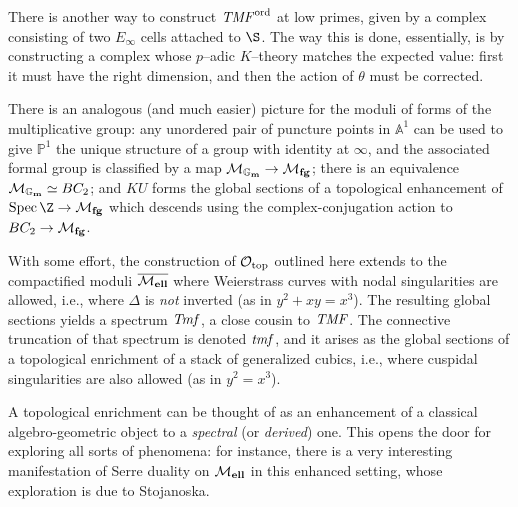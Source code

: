 \begin{remark}
There is another way to construct \(\mathit{TMF}^{\mathrm{ord}}\) at low primes, given by a complex consisting of two \(E_\infty\) cells attached to \(\S\).  The way this is done, essentially, is by constructing a complex whose \(p\)--adic \(K\)--theory matches the expected value: first it must have the right dimension, and then the action of \(\theta\) must be corrected.
\end{remark}

\begin{remark}
There is an analogous (and much easier) picture for the moduli of forms of the multiplicative group: any unordered pair of puncture points in \(\mathbb A^1\) can be used to give \(\mathbb P^1\) the unique structure of a group with identity at \(\infty\), and the associated formal group is classified by a map \(\mathcal{M}_{\mathbf{\mathbb G_m}} \to \mathcal{M}_{\mathbf{fg}}\); there is an equivalence \(\mathcal{M}_{\mathbf{\mathbb G_m}} \simeq BC_2\); and \(KU\) forms the global sections of a topological enhancement of \(\Spec \Z \to \moduli{fg}\) which descends using the complex-conjugation action to \(BC_2 \to \mathcal{M}_{\mathbf{fg}}\).
\end{remark}

\begin{remark}
With some effort, the construction of \(\mathcal{O}_{\mathrm{top}}\) outlined here extends to the compactified moduli \(\overline{\mathcal{M}_{\mathbf{ell}}}\) where Weierstrass curves with nodal singularities are allowed, i.e., where \(\Delta\) is \emph{not} inverted (as in \(y^2 + xy = x^3\)).  The resulting global sections yields a spectrum \(\mathit{Tmf}\), a close cousin to \(\mathit{TMF}\).  The connective truncation of that spectrum is denoted \(\mathit{tmf}\), and it arises as the global sections of a topological enrichment of a stack of generalized cubics, i.e., where cuspidal singularities are also allowed (as in \(y^2 = x^3\)).
\end{remark}

\begin{remark}
A topological enrichment can be thought of as an enhancement of a classical algebro-geometric object to a \textit{spectral} (or \textit{derived}) one.  This opens the door for exploring all sorts of phenomena: for instance, there is a very interesting manifestation of Serre duality on \(\mathcal{M}_{\mathbf{ell}}\) in this enhanced setting, whose exploration is due to Stojanoska.
\end{remark}

